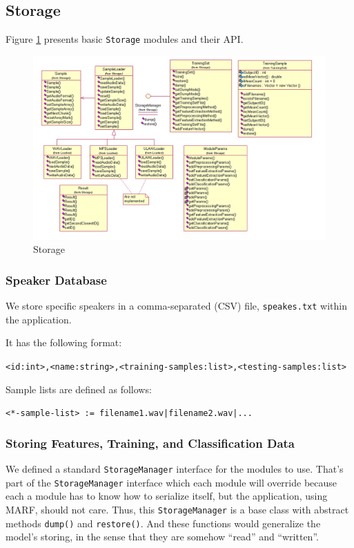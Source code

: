 \subsection{Storage}

Figure \ref{fig:storage}
presents basic \verb+Storage+ modules and their API.

\begin{figure}
	\centering
	\includegraphics[angle=90,totalheight=660pt]{../graphics/arch/storage.png}
	\caption{Storage}
	\label{fig:storage}
\end{figure}

\subsubsection{Speaker Database}

We store specific speakers in a comma-separated (CSV) file, \verb+speakes.txt+
within the application.

It has the following format:

\verb+<id:int>,<name:string>,<training-samples:list>,<testing-samples:list>+

Sample lists are defined as follows:

\verb+<*-sample-list> := filename1.wav|filename2.wav|...+

\subsubsection{Storing Features, Training, and Classification Data}

We defined a standard \verb+StorageManager+ interface for the modules to use.
That's part of the \verb+StorageManager+ interface which each module will override
because each a module has to know how to serialize itself, but the application,
using MARF, should not care.
Thus, this \verb+StorageManager+ is a base class with abstract methods \verb+dump()+ and
\verb+restore()+. And these functions would generalize the
model's storing, in the sense that they are somehow ``read'' and ``written''.

